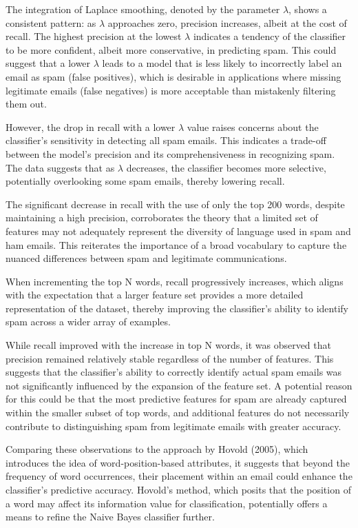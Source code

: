 \documentclass{acm_proc_article-sp}
\begin{document}
The integration of Laplace smoothing, denoted by the parameter \(\lambda\), shows a consistent pattern: as \(\lambda\) approaches zero, precision increases, albeit at the cost of recall. The highest precision at the lowest \(\lambda\) indicates a tendency of the classifier to be more confident, albeit more conservative, in predicting spam. This could suggest that a lower \(\lambda\) leads to a model that is less likely to incorrectly label an email as spam (false positives), which is desirable in applications where missing legitimate emails (false negatives) is more acceptable than mistakenly filtering them out.

However, the drop in recall with a lower \(\lambda\) value raises concerns about the classifier's sensitivity in detecting all spam emails. This indicates a trade-off between the model's precision and its comprehensiveness in recognizing spam. The data suggests that as \(\lambda\) decreases, the classifier becomes more selective, potentially overlooking some spam emails, thereby lowering recall.

The significant decrease in recall with the use of only the top 200 words, despite maintaining a high precision, corroborates the theory that a limited set of features may not adequately represent the diversity of language used in spam and ham emails. This reiterates the importance of a broad vocabulary to capture the nuanced differences between spam and legitimate communications.

When incrementing the top N words, recall progressively increases, which aligns with the expectation that a larger feature set provides a more detailed representation of the dataset, thereby improving the classifier's ability to identify spam across a wider array of examples.

While recall improved with the increase in top N words, it was observed that precision remained relatively stable regardless of the number of features. This suggests that the classifier's ability to correctly identify actual spam emails was not significantly influenced by the expansion of the feature set. A potential reason for this could be that the most predictive features for spam are already captured within the smaller subset of top words, and additional features do not necessarily contribute to distinguishing spam from legitimate emails with greater accuracy.

Comparing these observations to the approach by Hovold (2005), which introduces the idea of word-position-based attributes, it suggests that beyond the frequency of word occurrences, their placement within an email could enhance the classifier's predictive accuracy. Hovold's method, which posits that the position of a word may affect its information value for classification, potentially offers a means to refine the Naive Bayes classifier further.
\end{document}
